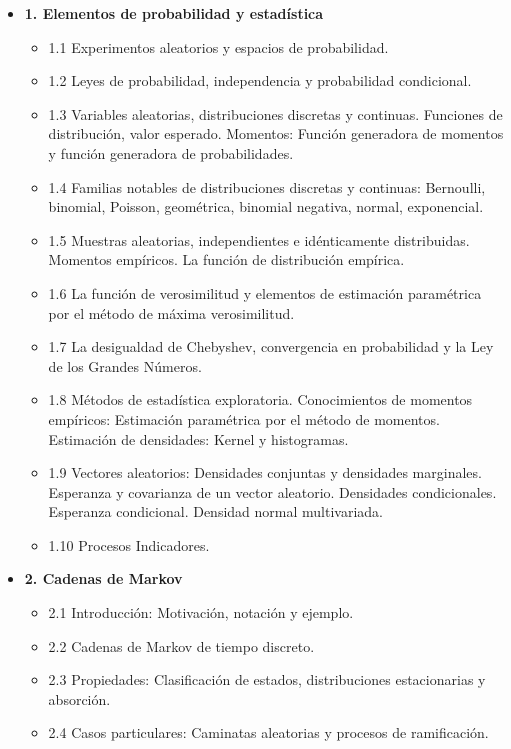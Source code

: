 \documentclass[10pt,a4paper]{article}
\begin{document}
\begin{itemize}
    \item \textbf{1. Elementos de probabilidad y estadística}
    \begin{itemize}
        \item 1.1 Experimentos aleatorios y espacios de probabilidad.
        \item 1.2 Leyes de probabilidad, independencia y probabilidad condicional.
        \item 1.3 Variables aleatorias, distribuciones discretas y continuas. Funciones de distribución, valor esperado. Momentos: Función generadora de momentos y función generadora de probabilidades.
        \item 1.4 Familias notables de distribuciones discretas y continuas: Bernoulli, binomial, Poisson, geométrica, binomial negativa, normal, exponencial.
        \item 1.5 Muestras aleatorias, independientes e idénticamente distribuidas. Momentos empíricos. La función de distribución empírica.
        \item 1.6 La función de verosimilitud y elementos de estimación paramétrica por el método de máxima verosimilitud.
        \item 1.7 La desigualdad de Chebyshev, convergencia en probabilidad y la Ley de los Grandes Números.
        \item 1.8 Métodos de estadística exploratoria. Conocimientos de momentos empíricos: Estimación paramétrica por el método de momentos. Estimación de densidades: Kernel y histogramas.
        \item 1.9 Vectores aleatorios: Densidades conjuntas y densidades marginales. Esperanza y covarianza de un vector aleatorio. Densidades condicionales. Esperanza condicional. Densidad normal multivariada.
        \item 1.10 Procesos Indicadores.
    \end{itemize}

    \item \textbf{2. Cadenas de Markov}
    \begin{itemize}
        \item 2.1 Introducción: Motivación, notación y ejemplo.
        \item 2.2 Cadenas de Markov de tiempo discreto.
        \item 2.3 Propiedades: Clasificación de estados, distribuciones estacionarias y absorción.
        \item 2.4 Casos particulares: Caminatas aleatorias y procesos de ramificación.
    \end{itemize}


\end{itemize}
\end{document}

